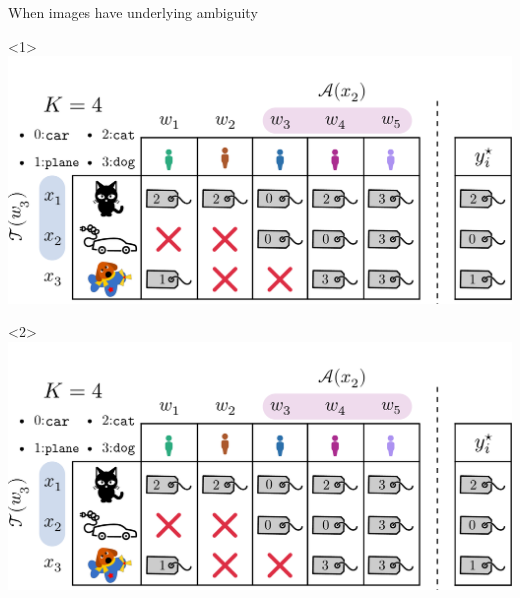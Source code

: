 \begin{frame}{When images have underlying ambiguity}{}
    \begin{onlyenv}<1>
        \includegraphics[width=\textwidth, clip,trim={0cm 4cm 0cm 0cm}]{./images/notations_1.pdf}
     \end{onlyenv}
     \begin{onlyenv}<2>
        \includegraphics[width=\textwidth]{./images/notations_1.pdf}
    \end{onlyenv}
\end{frame}

